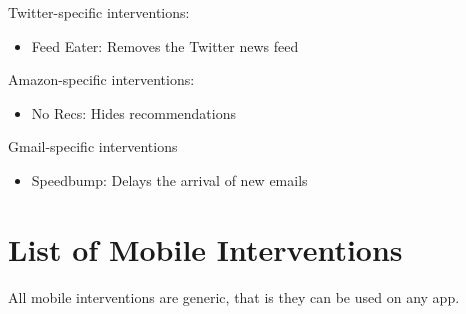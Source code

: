 \vspace{2mm}

Twitter-specific interventions:

\begin{itemize}
    \item Feed Eater: Removes the Twitter news feed
\end{itemize}

\vspace{2mm}

Amazon-specific interventions:

\begin{itemize}
    \item No Recs: Hides recommendations
\end{itemize}

\vspace{2mm}

Gmail-specific interventions

\begin{itemize}
    \item Speedbump: Delays the arrival of new emails
\end{itemize}

\vspace{3mm}


\section{List of Mobile Interventions}

All mobile interventions are generic, that is they can be used on any app.

